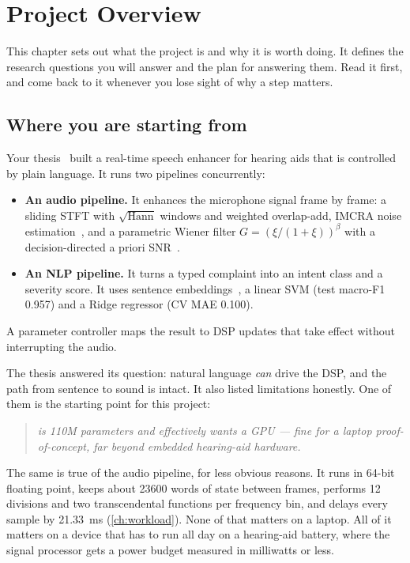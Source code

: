 \chapter{Project Overview}\label{ch:overview}

This chapter sets out what the project is and why it is worth doing. It defines
the research questions you will answer and the plan for answering them. Read it
first, and come back to it whenever you lose sight of why a step matters.

\section{Where you are starting from}\label{sec:overview:start}

Your thesis~\cite{burrell2026thesis} built a real-time speech enhancer for
hearing aids that is controlled by plain language. It runs two pipelines
concurrently:

\begin{itemize}
  \item \textbf{An audio pipeline.} It enhances the microphone signal frame by
  frame: a sliding STFT with $\sqrt{\text{Hann}}$ windows and weighted
  overlap-add, IMCRA noise estimation~\cite{cohen2003imcra}, and a parametric
  Wiener filter $G=(\xi/(1+\xi))^\beta$ with a decision-directed a priori
  SNR~\cite{ephraim1984mmse}.
  \item \textbf{An NLP pipeline.} It turns a typed complaint into an intent
  class and a severity score. It uses  sentence
  embeddings~\cite{reimers2019sbert,song2020mpnet}, a linear SVM (test
  macro-F1 0.957) and a Ridge regressor (CV MAE 0.100).
\end{itemize}
A parameter controller maps the result to DSP updates that take effect without
interrupting the audio.

The thesis answered its question: natural language \emph{can} drive the DSP, and
the path from sentence to sound is intact. It also listed limitations
honestly. One of them is the starting point for this project:

\begin{quote}\itshape
{} is 110M parameters and effectively wants a GPU --- fine
for a laptop proof-of-concept, far beyond embedded hearing-aid hardware.
\end{quote}

The same is true of the audio pipeline, for less obvious reasons. It runs in
64-bit floating point, keeps about \num{23600} words of state between frames,
performs 12 divisions and two transcendental functions per frequency bin, and
delays every sample by \qty{21.33}{\ms} (\cref{ch:workload}). None of that
matters on a laptop. All of it matters on a device that has to run all day on
a hearing-aid battery, where the signal processor gets a power budget measured
in milliwatts or less.

